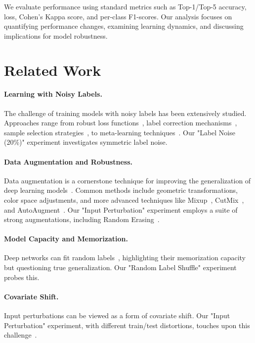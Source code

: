 \documentclass[10pt,twocolumn,letterpaper]{article}
\begin{document}
We evaluate performance using standard metrics such as Top-1/Top-5 accuracy, loss, Cohen's Kappa score, and per-class F1-scores. Our analysis focuses on quantifying performance changes, examining learning dynamics, and discussing implications for model robustness.

\section{Related Work}
\label{sec:related}

\paragraph{Learning with Noisy Labels.} The challenge of training models with noisy labels has been extensively studied. Approaches range from robust loss functions~\cite{Ghosh2017RobustLF,Zhang2018GeneralizedCE}, label correction mechanisms~\cite{Reed2015TrainingDN}, sample selection strategies~\cite{Han2018Coteaching,Jiang2018MentorNet}, to meta-learning techniques~\cite{Li2019LearningTR}. Our "Label Noise (20\%)" experiment investigates symmetric label noise.

\paragraph{Data Augmentation and Robustness.} Data augmentation is a cornerstone technique for improving the generalization of deep learning models~\cite{Shorten2019ASO}. Common methods include geometric transformations, color space adjustments, and more advanced techniques like Mixup~\cite{Zhang2018mixupBE}, CutMix~\cite{Yun2019CutMixRS}, and AutoAugment~\cite{Cubuk2019AutoAugmentLA}. Our "Input Perturbation" experiment employs a suite of strong augmentations, including Random Erasing~\cite{Zhong2020RandomED}.

\paragraph{Model Capacity and Memorization.} Deep networks can fit random labels~\cite{Zhang2017UnderstandingDL}, highlighting their memorization capacity but questioning true generalization. Our "Random Label Shuffle" experiment probes this.

\paragraph{Covariate Shift.} Input perturbations can be viewed as a form of covariate shift. Our "Input Perturbation" experiment, with different train/test distortions, touches upon this challenge~\cite{Patel2015VisualDA}.
\end{document}
